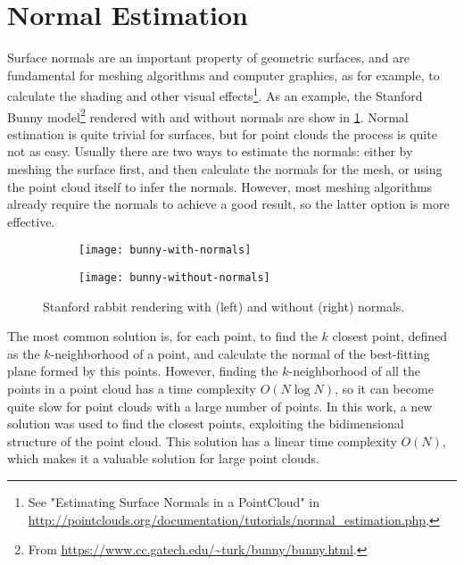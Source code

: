 \section{Normal Estimation}
\label{section:normal-estimation}

Surface normals are an important property of geometric surfaces, and are fundamental for meshing algorithms and computer graphics, as for example, to calculate the shading and other visual effects\footnote{See "Estimating Surface Normals in a PointCloud" in \url{http://pointclouds.org/documentation/tutorials/normal_estimation.php}.}. As an example, the Stanford Bunny model\footnote{From \url{https://www.cc.gatech.edu/~turk/bunny/bunny.html}.} rendered with and without normals are show in \cref{figure:bunny-normals}. Normal estimation is quite trivial for surfaces, but for point clouds the process is quite not as easy. Usually there are two ways to estimate the normals: either by meshing the surface first, and then calculate the normals for the mesh, or using the point cloud itself to infer the normals. However, most meshing algorithms already require the normals to achieve a good result, so the latter option is more effective.

\begin{figure}[h]
    
    \centering
    \begin{subfigure}{0.4\textwidth}
        \centering
        \texttt{[image: bunny-with-normals]}     
    \end{subfigure}%
    \begin{subfigure}{0.4\textwidth}
        \centering
        \texttt{[image: bunny-without-normals]}     
    \end{subfigure}

    \caption{Stanford rabbit rendering with (left) and without (right) normals.}
    \label{figure:bunny-normals}

\end{figure}

The most common solution is, for each point, to find the $k$ closest point, defined as the $k$-neighborhood of a point, and calculate the normal of the best-fitting plane formed by this points. However, finding the $k$-neighborhood of all the points in a point cloud has a time complexity $O(N \log N)$, so it can become quite slow for point clouds with a large number of points. In this work, a new solution was used to find the closest points, exploiting the bidimensional structure of the point cloud. This solution has a linear time complexity $O(N)$, which makes it a valuable solution for large point clouds.

